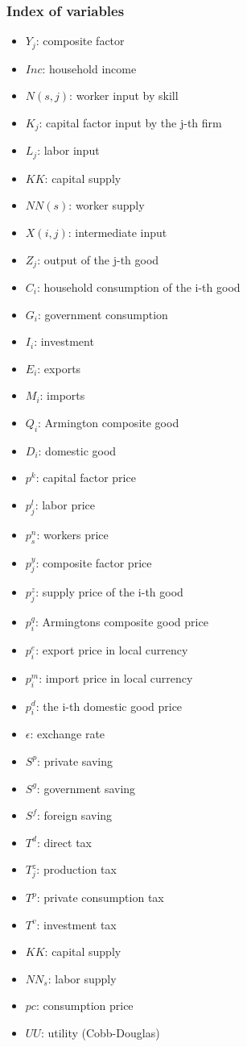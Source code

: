 \subsubsection{Index of variables}
\begin{itemize} 
	\item $Y_j$: composite factor
	\item $Inc$: household income
	\item $N(s,j)$: worker input by skill
	\item $K_j$: capital factor input by the j-th firm
	\item $L_j$: labor input      
	\item $KK$: capital supply
	\item $NN(s)$: worker supply
	\item $X(i,j)$: intermediate input
	\item $Z_j$: output of the j-th good
	\item $C_i$: household consumption of the i-th good
	\item $G_i$: government consumption
	\item $I_i$: investment
	\item $E_i$: exports
	\item $M_i$: imports
	\item $Q_i$: Armington composite good
	\item $D_i$: domestic good

	\item $p^k$: capital factor price
	\item $p^l_j$: labor price
	\item $p^n_s$: workers price
	\item $p^y_j$: composite factor price
	\item $p^z_j$: supply price of the i-th good
	\item $p^q_i$: Armingtons composite good price
	\item $p^e_i$: export price in local currency
	\item $p^m_i$: import price in local currency
	\item $p^d_i$: the i-th domestic good price
	\item $\epsilon$: exchange rate

	\item $S^p$: private saving
	\item $S^g$: government saving
	\item $S^f$: foreign saving
	\item $T^d$: direct tax
	\item $T^z_j$: production tax
	\item $T^p$: private consumption tax
	\item $T^v$: investment tax

	\item $KK$: capital supply
	\item $NN_s$: labor supply
	\item $pc$: consumption price

	\item $UU$: utility (Cobb-Douglas)
\end{itemize}

